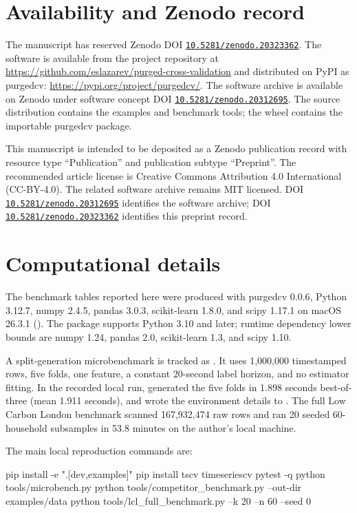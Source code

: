 \documentclass[11pt]{article}
\newcommand{\pcv}{\textsf{purgedcv}}
\newcommand{\pkg}[1]{\textsf{#1}}
\DeclareRobustCommand{\code}[1]{\texttt{\detokenize{#1}}}
\newcommand{\doi}[1]{\href{https://doi.org/#1}{\nolinkurl{#1}}}
\begin{document}
\section*{Availability and Zenodo record}

The manuscript has reserved Zenodo DOI \doi{10.5281/zenodo.20323362}. The
software is available from the project repository at
\url{https://github.com/eslazarev/purged-cross-validation} and distributed on
PyPI as \pkg{purgedcv}: \url{https://pypi.org/project/purgedcv/}. The software
archive is available on Zenodo under software concept DOI
\doi{10.5281/zenodo.20312695}. The source distribution contains the examples
and benchmark tools; the wheel contains the importable \pcv{} package.

This manuscript is intended to be deposited as a Zenodo publication record with
resource type ``Publication'' and publication subtype ``Preprint''. The
recommended article license is Creative Commons Attribution 4.0 International
(CC-BY-4.0). The related software archive remains MIT licensed. DOI
\doi{10.5281/zenodo.20312695} identifies the software archive; DOI
\doi{10.5281/zenodo.20323362} identifies this preprint record.

\section*{Computational details}

The benchmark tables reported here were produced with \pcv{} 0.0.6, Python
3.12.7, \pkg{numpy} 2.4.5, \pkg{pandas} 3.0.3, \pkg{scikit-learn} 1.8.0, and
\pkg{scipy} 1.17.1 on macOS 26.3.1 (\code{arm64}). The package supports Python
3.10 and later; runtime dependency lower bounds are \pkg{numpy} 1.24,
\pkg{pandas} 2.0, \pkg{scikit-learn} 1.3, and \pkg{scipy} 1.10.

A split-generation microbenchmark is tracked as \code{tools/microbench.py}. It
uses 1,000,000 timestamped rows, five folds, one feature, a constant 20-second
label horizon, and no estimator fitting. In the recorded local run,
\code{PurgedKFold} generated the five folds in 1.898 seconds best-of-three
(mean 1.911 seconds), and wrote the environment details to
.
The full Low Carbon London benchmark scanned 167,932,474 raw rows and ran 20
seeded 60-household subsamples in 53.8 minutes on the author's local machine.

The main local reproduction commands are:

\begin{Code}
pip install -e ".[dev,examples]"
pip install tscv timeseriescv
pytest -q
python tools/microbench.py
python tools/competitor_benchmark.py --out-dir examples/data
python tools/lcl_full_benchmark.py --k 20 --n 60 --seed 0
\end{Code}
\end{document}
